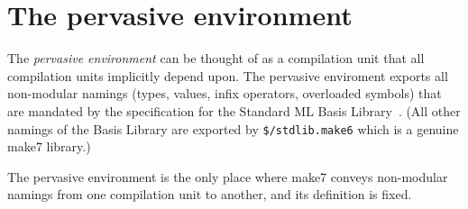 
\section{The pervasive environment}

The {\em pervasive environment} can be thought of as a compilation
unit that all compilation units implicitly depend upon.  The pervasive
enviroment exports all non-modular namings (types, values, infix
operators, overloaded symbols) that are mandated by the specification
for the Standard ML Basis Library~\cite{reppy99:basis}.  (All other
namings of the Basis Library are exported by {\tt \$/stdlib.make6} which is
a genuine make7 library.)

The pervasive environment is the only place where make7 conveys
non-modular namings from one compilation unit to another, and its
definition is fixed.
